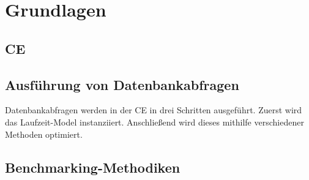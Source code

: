\chapter{Grundlagen}
\section{\acl{CE}}
\section{Ausführung von Datenbankabfragen}
Datenbankabfragen werden in der \ac{CE} in drei Schritten ausgeführt. Zuerst wird das Laufzeit-Model instanziiert. Anschließend wird dieses mithilfe verschiedener Methoden optimiert.
\section{Benchmarking-Methodiken}
